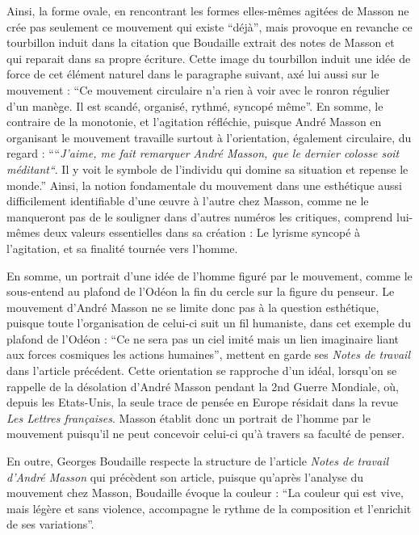 	Ainsi, la forme ovale, en rencontrant les formes elles-mêmes agitées de Masson ne crée pas seulement ce mouvement qui existe \enquote{déjà}, mais provoque en revanche ce tourbillon induit dans la citation que Boudaille extrait des notes de Masson et qui reparait dans sa propre écriture. Cette image du tourbillon induit une idée de force de cet élément naturel dans le paragraphe suivant, axé lui aussi sur le mouvement : \enquote{Ce mouvement circulaire n’a rien à voir avec le ronron régulier d’un manège. Il est scandé, organisé, rythmé, syncopé même}. En somme, le contraire de la monotonie, et l’agitation réfléchie, puisque André Masson en organisant le mouvement travaille surtout à l’orientation, également circulaire, du regard : \enquote{“\emph{J’aime, me fait remarquer André Masson, que le dernier colosse soit méditant“}. Il y voit le symbole de l’individu qui domine sa situation et repense le monde.} Ainsi, la notion fondamentale du mouvement dans une esthétique aussi difficilement identifiable d’une \oe{}uvre à l’autre chez Masson, comme ne le manqueront pas de le souligner dans d’autres numéros les critiques, comprend lui-mêmes deux valeurs essentielles dans sa création : Le lyrisme syncopé à l’agitation, et sa finalité tournée vers l’homme. 

	En somme, un portrait d’une idée de l’homme figuré par le mouvement, comme le sous-entend au plafond de l’Odéon la fin du cercle sur la figure du penseur. Le mouvement d’André Masson ne se limite donc pas à la question esthétique, puisque toute l’organisation de celui-ci suit un fil humaniste, dans cet exemple du plafond de l’Odéon : \enquote{Ce ne sera pas un ciel imité mais un lien imaginaire liant aux forces cosmiques les actions humaines}, mettent en garde ses \emph{Notes de travail} dans l’article précédent. Cette orientation se rapproche d’un idéal, lorsqu’on se rappelle de la désolation d’André Masson pendant la 2nd Guerre Mondiale, où, depuis les Etats-Unis, la seule trace de pensée en Europe résidait dans la revue \emph{Les Lettres françaises}. Masson établit donc un portrait de l’homme par le mouvement puisqu’il ne peut concevoir celui-ci qu’à travers sa faculté de penser. 

En outre, Georges Boudaille respecte la structure de l'article  \emph{Notes de travail d’André Masson} qui précèdent son article, puisque qu’après l’analyse du mouvement chez Masson, Boudaille évoque la couleur : \enquote{La couleur qui est vive, mais légère et sans violence, accompagne le rythme de la composition et l’enrichit de ses variations}. 


